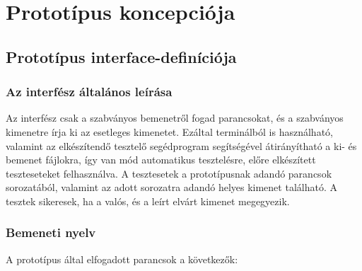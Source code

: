 %
\chapter{Prototípus koncepciója}

\thispagestyle{fancy}



\section{Prototípus interface-definíciója}

\subsection{Az interfész általános leírása}

Az interfész csak a szabványos bemenetről fogad parancsokat, és a szabványos kimenetre írja ki az esetleges kimenetet. Ezáltal terminálból is használható, valamint az elkészítendő tesztelő segédprogram segítségével átirányítható a ki- és bemenet fájlokra, így van mód automatikus tesztelésre, előre elkészített teszteseteket felhasználva. A tesztesetek a prototípusnak adandó parancsok sorozatából, valamint az adott sorozatra adandó helyes kimenet található. A tesztek sikeresek, ha a valós, és a leírt elvárt kimenet megegyezik.

\subsection{Bemeneti nyelv}

A prototípus által elfogadott parancsok a következők:


